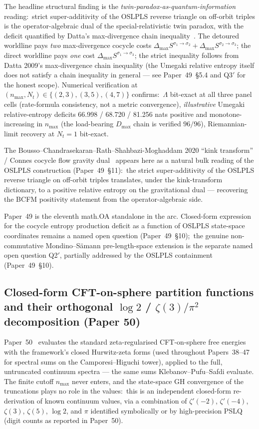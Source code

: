 \documentclass[11pt,a4paper]{article}
\theoremstyle{plain}
\theoremstyle{definition}
\newcommand{\nmax}{n_{\max}}
\newcommand{\Nt}{N_{t}}
\begin{document}
The headline structural finding is the
\emph{twin-paradox-as-quantum-information} reading:\ strict
super-additivity of the OSLPLS reverse triangle on off-orbit triples
is the operator-algebraic dual of the special-relativistic twin
paradox, with the deficit quantified by Datta's max-divergence chain
inequality~\cite{datta2009}.  The detoured worldline pays \emph{two}
max-divergence cocycle costs
$\Delta_{\max} S^{\sigma_{1} \to \sigma_{2}} +
\Delta_{\max} S^{\sigma_{2} \to \sigma_{3}}$; the direct worldline pays
\emph{one} cost $\Delta_{\max} S^{\sigma_{1} \to \sigma_{3}}$; the
strict inequality follows from Datta 2009's max-divergence chain
inequality (the Umegaki relative entropy itself does not satisfy a
chain inequality in general --- see Paper~49~\S 5.4 and Q3$'$ for
the honest scope).  Numerical verification at
$(\nmax, \Nt) \in \{(2,3), (3,5), (4,7)\}$ confirms:\
$\Lambda$ bit-exact at all three panel cells (rate-formula consistency,
not a metric convergence), \emph{illustrative} Umegaki relative-entropy
deficits 66.998 / 68.720 / 81.256 nats positive and monotone-increasing
in $\nmax$ (the load-bearing $D_{\max}$ chain is verified $96/96$),
Riemannian-limit recovery at $\Nt = 1$ bit-exact.

The Bousso--Chandrasekaran--Rath--Shahbazi-Moghaddam 2020 ``kink transform'' / Connes
cocycle flow gravity dual~\cite{bousso_etal2020} appears here as a
natural bulk reading of the OSLPLS construction (Paper~49~\S 11):\ the
strict super-additivity of the OSLPLS reverse triangle on off-orbit
triples translates, under the kink-transform dictionary, to a positive
relative entropy on the gravitational dual --- recovering the BCFM
positivity statement from the operator-algebraic side.

Paper~49 is the eleventh math.OA standalone in the arc.  Closed-form
expression for the cocycle entropy production deficit as a function of
OSLPLS state-space coordinates remains a named open question
(Paper~49~\S 10);\ the genuine non-commutative Mondino--S\"amann
pre-length-space extension is the separate named open question Q2$'$,
partially addressed by the OSLPLS containment (Paper~49~\S 10).

\subsection{Closed-form CFT-on-sphere partition functions and their
orthogonal $\log 2$ / $\zeta(3)/\pi^{2}$ decomposition
(Paper 50)}
\label{sec:closures_post_49}

Paper~50~\cite{paper50} evaluates the standard zeta-regularised
CFT-on-sphere free energies with the framework's closed Hurwitz-zeta
forms (used throughout Papers~38--47 for spectral sums on the
Camporesi--Higuchi tower), applied to the full, untruncated continuum
spectra --- the same sums Klebanov--Pufu--Safdi evaluate.  The finite
cutoff $n_{\max}$ never enters, and the state-space GH convergence of the
truncations plays no role in the values:\ this is an independent
closed-form re-derivation of known continuum values, via a combination
of $\zeta'(-2)$, $\zeta'(-4)$, $\zeta(3)$, $\zeta(5)$, $\log 2$, and
$\pi$ identified symbolically or by high-precision PSLQ (digit counts as
reported in Paper~50).
\end{document}
